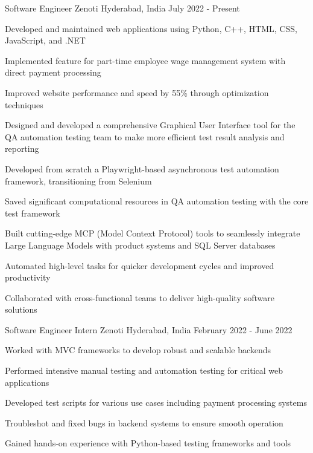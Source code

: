 \documentclass[11pt, a4paper]{awesome-cv} %
\begin{document}
\begin{cventries}
\cventry
    {Software Engineer} %
    {Zenoti} %
    {Hyderabad, India} %
    {July 2022 - Present} %
    {
      \begin{cvitems}
        \item {Developed and maintained web applications using Python, C++, HTML, CSS, JavaScript, and \textsc{.NET}}
        \item {Implemented feature for part-time employee wage management system with direct payment processing}
        \item {Improved website performance and speed by 55\% through optimization techniques}
        \item {Designed and developed a comprehensive Graphical User Interface tool for the QA automation testing team to make more efficient test result analysis and reporting}
        \item {Developed from scratch a Playwright-based asynchronous test automation framework, transitioning from Selenium}
        \item {Saved significant computational resources in QA automation testing with the core test framework}
        \item {Built cutting-edge MCP (Model Context Protocol) tools to seamlessly integrate Large Language Models with product systems and SQL Server databases}
        \item {Automated high-level tasks for quicker development cycles and improved productivity}
        \item {Collaborated with cross-functional teams to deliver high-quality software solutions}
      \end{cvitems}
    }

\cventry
    {Software Engineer Intern} %
    {Zenoti} %
    {Hyderabad, India} %
    {February 2022 - June 2022} %
    {
      \begin{cvitems}
        \item {Worked with MVC frameworks to develop robust and scalable backends}
        \item {Performed intensive manual testing and automation testing for critical web applications}
        \item {Developed test scripts for various use cases including payment processing systems}
        \item {Troubleshot and fixed bugs in backend systems to ensure smooth operation}
        \item {Gained hands-on experience with Python-based testing frameworks and tools}
      \end{cvitems}
    }
\end{cventries}



\end{document}
